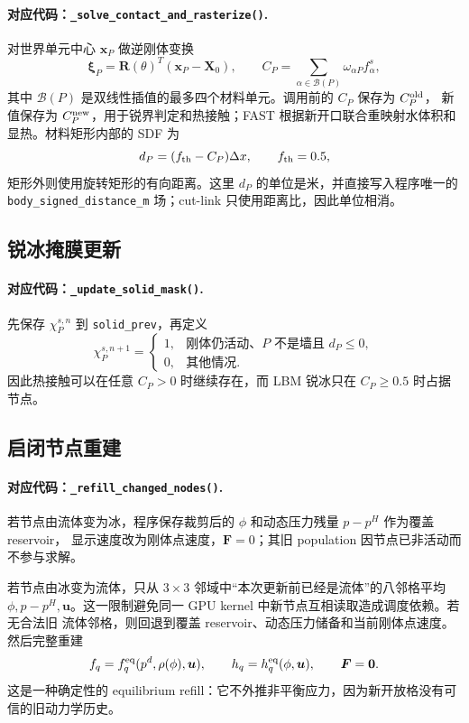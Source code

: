 \documentclass[UTF8,zihao=-4]{ctexart}
\newcommand{\vect}[1]{\boldsymbol{#1}}
\newcommand{\code}[1]{\texttt{#1}}
\newcommand{\stepname}[1]{\paragraph{对应代码：\code{#1}.}}
\numberwithin{equation}{section}
\begin{document}
\stepname{\_solve\_contact\_and\_rasterize()}
对世界单元中心 $\vect x_P$ 做逆刚体变换
\begin{equation}
  \vect\xi_P=\vect R(\theta)^T(\vect x_P-\vect X_0),
  \qquad
  C_P=\sum_{\alpha\in\mathcal B(P)}\omega_{\alpha P}f_\alpha^s,
  \label{eq:world-raster}
\end{equation}
其中 $\mathcal B(P)$ 是双线性插值的最多四个材料单元。调用前的 $C_P$ 保存为 $C_P^{\rm old}$，
新值保存为 $C_P^{\rm new}$，用于锐界判定和热接触；FAST 根据新开口联合重映射水体积和显热。材料矩形内部的 SDF 为
\begin{equation}
  d_P=(f_{\rm th}-C_P)\Delta x,
  \qquad f_{\rm th}=0.5,
  \label{eq:world-sdf}
\end{equation}
矩形外则使用旋转矩形的有向距离。这里 $d_P$ 的单位是米，并直接写入程序唯一的
\code{body\_signed\_distance\_m} 场；cut-link 只使用距离比，因此单位相消。

\subsection{锐冰掩膜更新}

\stepname{\_update\_solid\_mask()}
先保存 $\chi_P^{s,n}$ 到 \code{solid\_prev}，再定义
\begin{equation}
  \chi_P^{s,n+1}=
  \begin{cases}
  1,&\text{刚体仍活动、$P$ 不是墙且 }d_P\le0,\\
  0,&\text{其他情况}.
  \end{cases}
  \label{eq:sharp-mask}
\end{equation}
因此热接触可以在任意 $C_P>0$ 时继续存在，而 LBM 锐冰只在 $C_P\ge0.5$ 时占据节点。

\subsection{启闭节点重建}

\stepname{\_refill\_changed\_nodes()}
若节点由流体变为冰，程序保存裁剪后的 $\phi$ 和动态压力残量 $p-p^H$ 作为覆盖 reservoir，
显示速度改为刚体点速度，$\vect F=0$；其旧 population 因节点已非活动而不参与求解。

若节点由冰变为流体，只从 $3\times3$ 邻域中“本次更新前已经是流体”的八邻格平均
$\phi,p-p^H,\vect u$。这一限制避免同一 GPU kernel 中新节点互相读取造成调度依赖。若无合法旧
流体邻格，则回退到覆盖 reservoir、动态压力储备和当前刚体点速度。然后完整重建
\begin{equation}
  f_q=f_q^{\rm eq}(p^d,\rho(\phi),\vect u),
  \qquad h_q=h_q^{\rm eq}(\phi,\vect u),
  \qquad \vect F=\vect0.
  \label{eq:equilibrium-refill}
\end{equation}
这是一种确定性的 equilibrium refill：它不外推非平衡应力，因为新开放格没有可信的旧动力学历史。
\end{document}
